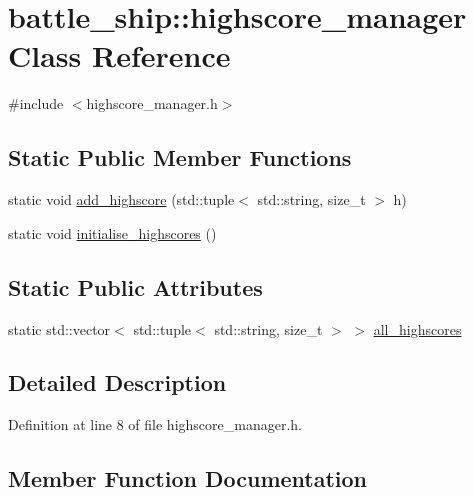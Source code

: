\hypertarget{classbattle__ship_1_1highscore__manager}{}\section{battle\+\_\+ship\+:\+:highscore\+\_\+manager Class Reference}
\label{classbattle__ship_1_1highscore__manager}


{\ttfamily \#include $<$highscore\+\_\+manager.\+h$>$}

\subsection*{Static Public Member Functions}
\begin{DoxyCompactItemize}
\item 
static void \hyperlink{classbattle__ship_1_1highscore__manager_ad53b09dec3b84ab8cc9ccf607ea1ffd8}{add\+\_\+highscore} (std\+::tuple$<$ std\+::string, size\+\_\+t $>$ h)
\item 
static void \hyperlink{classbattle__ship_1_1highscore__manager_a404a994ea85111522a7a4f571bcbacdc}{initialise\+\_\+highscores} ()
\end{DoxyCompactItemize}
\subsection*{Static Public Attributes}
\begin{DoxyCompactItemize}
\item 
static std\+::vector$<$ std\+::tuple$<$ std\+::string, size\+\_\+t $>$ $>$ \hyperlink{classbattle__ship_1_1highscore__manager_a3a51d2dfb6210fea016ef59238d35861}{all\+\_\+highscores}
\end{DoxyCompactItemize}


\subsection{Detailed Description}


Definition at line 8 of file highscore\+\_\+manager.\+h.



\subsection{Member Function Documentation}
\mbox{\label{classbattle__ship_1_1highscore__manager_ad53b09dec3b84ab8cc9ccf607ea1ffd8}} 
